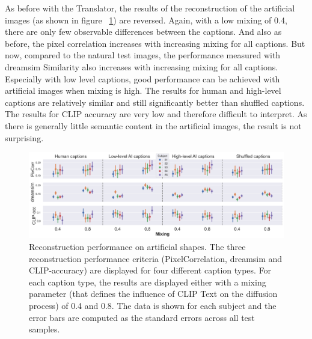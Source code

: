 As before with the Translator, the results of the reconstruction of the artificial images (as shown in figure ~\ref{fig:aicap_reconstruction_art_both_mixings}) are reversed. Again, with a low mixing of 0.4, there are only few observable differences between the captions. And also as before, the pixel correlation increases with increasing mixing for all captions. But now, compared to the natural test images, the performance measured with dreamsim Similarity also increases with increasing mixing for all captions. Especially with low level captions, good performance can be achieved with artificial images when mixing is high. The results for human and high-level captions are relatively similar and still significantly better than shuffled captions. The results for CLIP accuracy are very low and therefore difficult to interpret. As there is generally little semantic content in the artificial images, the result is not surprising. 

\begin{figure}[ht]
    \centering
    \includegraphics[width=1\textwidth]{plots/aicap_reconstruction_art_both_mixings.png}
    \caption[Experiment 2: Reconstruction performance on artificial shapes]{Reconstruction performance on artificial shapes. The three reconstruction performance criteria (PixelCorrelation, dreamsim and CLIP-accuracy) are displayed for four different caption types. For each caption type, the results are displayed either with a mixing parameter (that defines the influence of CLIP Text on the diffusion process) of 0.4 and 0.8. The data is shown for each subject and the error bars are computed as the standard errors across all test samples.}\label{fig:aicap_reconstruction_art_both_mixings}
\end{figure}


